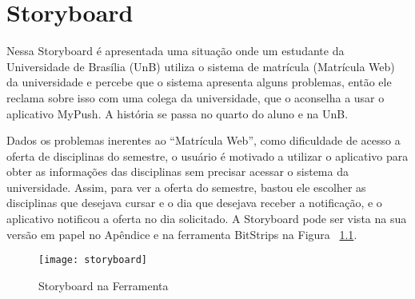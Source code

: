 \chapter{Storyboard}

Nessa Storyboard é apresentada uma situação onde um estudante da Universidade de Brasília (UnB) utiliza o sistema de matrícula (Matrícula Web) da universidade e 
percebe que o sistema apresenta alguns problemas, então ele reclama sobre isso com uma colega da universidade, que o aconselha a usar o aplicativo MyPush. 
A história se passa no quarto do aluno e na UnB. 

Dados os problemas inerentes ao “Matrícula Web”, como dificuldade de acesso a oferta de disciplinas do semestre, o usuário é motivado a utilizar o aplicativo 
para obter as informações das disciplinas sem precisar acessar o sistema da universidade. Assim, para ver a oferta do semestre, bastou ele escolher as disciplinas 
que desejava cursar e o dia que desejava receber a notificação, e o aplicativo notificou a oferta no dia solicitado. 
A Storyboard pode ser vista na sua versão em papel no Apêndice e na ferramenta BitStrips na Figura ~\ref{fig:storyboard}.

\begin{figure}[!htb]
 \centering
 \texttt{[image: storyboard]}
 \caption{Storyboard na Ferramenta}
 \label{fig:storyboard}

\end{figure}
